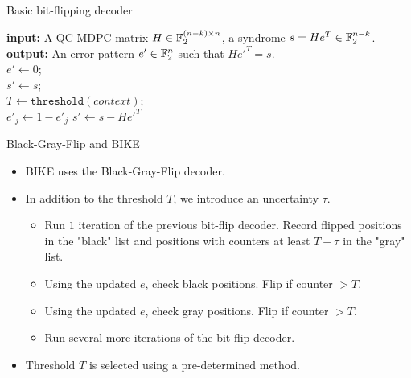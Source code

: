 \begin{frame}{Basic bit-flipping decoder}


\begin{algorithm}[H]
\textbf{input:} A QC-MDPC matrix $H \in \mathbb{F}_2^{(n-k) \times n}$, a syndrome $s = He^T \in \mathbb{F}_2^{n-k}$.\\
\textbf{output:} An error pattern $e' \in \mathbb{F}_2^n$ such that $He'^T = s$. \\
$e' \leftarrow 0$;\\
$s' \leftarrow s$;\\
$T \leftarrow \texttt{threshold}(context)$;\\
{
{
{
$e'_j \leftarrow 1- e'_j$
}
$s' \leftarrow s - He'^T$
}
}

\caption{Bit-flipping decoder}
\label{alg:seq}
\end{algorithm}

    
\end{frame}

\begin{frame}{Black-Gray-Flip and BIKE}
    \begin{itemize}
        \item BIKE uses the Black-Gray-Flip decoder.
        \item In addition to the threshold $T$, we introduce an uncertainty $\tau$.
        \begin{itemize}
            \item Run $1$ iteration of the previous bit-flip decoder. Record flipped positions in the "black" list and positions with counters at least $T - \tau$ in the "gray" list.
            \item Using the updated $e$, check black positions. Flip if counter $> T$.
            \item Using the updated $e$, check gray positions. Flip if counter $> T$.
            \item Run several more iterations of the bit-flip decoder.
            \end{itemize}
            \item Threshold $T$ is selected using a pre-determined method.
    \end{itemize}
\end{frame}


